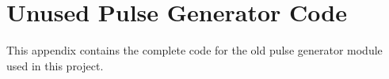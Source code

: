 \chapter{Unused Pulse Generator Code } \label{App:UnusedPulseGeneratorCode}

This appendix contains the complete code for the old pulse generator module used in this project.

